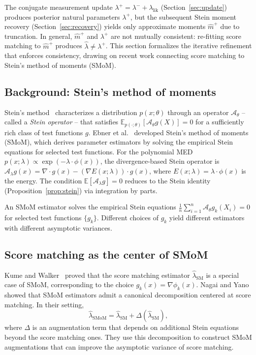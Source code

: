 \documentclass{article}
\newcommand{\E}{\mathbb{E}}
\theoremstyle{definition}
\begin{document}
The conjugate measurement update
$\lambda^+ = \lambda^- + \lambda_{\mathrm{lik}}$
(Section~\ref{sec:update})
produces posterior natural parameters $\lambda^+$, but the subsequent
Stein moment recovery (Section~\ref{sec:recovery}) yields only
approximate moments $\hat{m}^+$ due to truncation.
In general, $\hat{m}^+$ and $\lambda^+$ are not mutually consistent:
re-fitting score matching to $\hat{m}^+$ produces
$\hat\lambda \ne \lambda^+$.
This section formalizes the iterative refinement that enforces
consistency, drawing on recent work connecting score matching to
Stein's method of moments (SMoM).

\subsection{Background: Stein's method of moments}

Stein's method~\cite{stein1972} characterizes a distribution
$p(x;\theta)$ through an operator $\mathcal{A}_\theta$ --
called a \emph{Stein operator} -- that satisfies
$\E_{p(\cdot;\theta)}[\mathcal{A}_\theta g(X)] = 0$
for a sufficiently rich class of test functions $g$.
Ebner et al.~\cite{ebner2025} developed Stein's method of moments
(SMoM), which derives parameter estimators by solving the empirical
Stein equations for selected test functions.
For the polynomial MED
$p(x;\lambda) \propto \exp(-\lambda \cdot \phi(x))$,
the divergence-based Stein operator is
$\mathcal{A}_\lambda g(x)
= \nabla \cdot g(x) - (\nabla E(x;\lambda)) \cdot g(x)$,
where $E(x;\lambda) = \lambda \cdot \phi(x)$ is the energy.
The condition $\E[\mathcal{A}_\lambda g] = 0$ reduces to the
Stein identity (Proposition~\ref{prop:stein}) via integration by parts.

An SMoM estimator solves the empirical Stein equations
$\frac{1}{n}\sum_{i=1}^n \mathcal{A}_\theta g_k(X_i) = 0$
for selected test functions $\{g_k\}$.
Different choices of $g_k$ yield different estimators with different
asymptotic variances.

\subsection{Score matching as the center of SMoM}

Kume and Walker~\cite{kume2026} proved that the score matching
estimator $\hat\lambda_{\mathrm{SM}}$ is a special case of SMoM,
corresponding to the choice $g_k(x) = \nabla \phi_k(x)$.
Nagai and Yano~\cite{nagai2026} showed that SMoM estimators admit a
canonical decomposition centered at score matching. In their setting,
\begin{equation}\label{eq:smom-decomp}
  \hat\lambda_{\mathrm{SMoM}}
  = \hat\lambda_{\mathrm{SM}} + \Delta(\hat\lambda_{\mathrm{SM}}),
\end{equation}
where $\Delta$ is an augmentation term that depends on additional
Stein equations beyond the score matching ones.
They use this decomposition to construct SMoM augmentations that can
improve the asymptotic variance of score matching.
\end{document}
